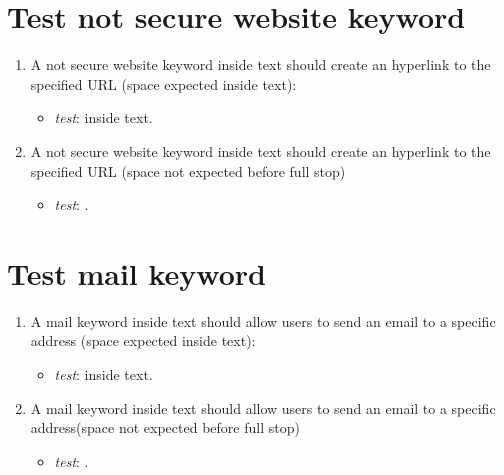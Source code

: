 \section{Test not secure website keyword}

\begin{enumerate}

\item A not secure website keyword inside text should create an hyperlink to the specified URL (space expected inside text):
\begin{itemize}
\item \textit{test}: \notSecureWebpageExample inside text.
\end{itemize}

\item A not secure website keyword inside text should create an hyperlink to the specified URL (space not expected before full stop)
\begin{itemize}
\item \textit{test}: \notSecureWebpageExample.
\end{itemize}

\end{enumerate}

\section{Test mail keyword}

\begin{enumerate}

\item A mail keyword inside text should allow users to send an email to a specific address (space expected inside text):
\begin{itemize}
\item \textit{test}: \myMail inside text.
\end{itemize}

\item A mail keyword inside text should allow users to send an email to a specific address(space not expected before full stop)
\begin{itemize}
\item \textit{test}: \myMail.
\end{itemize}

\end{enumerate}